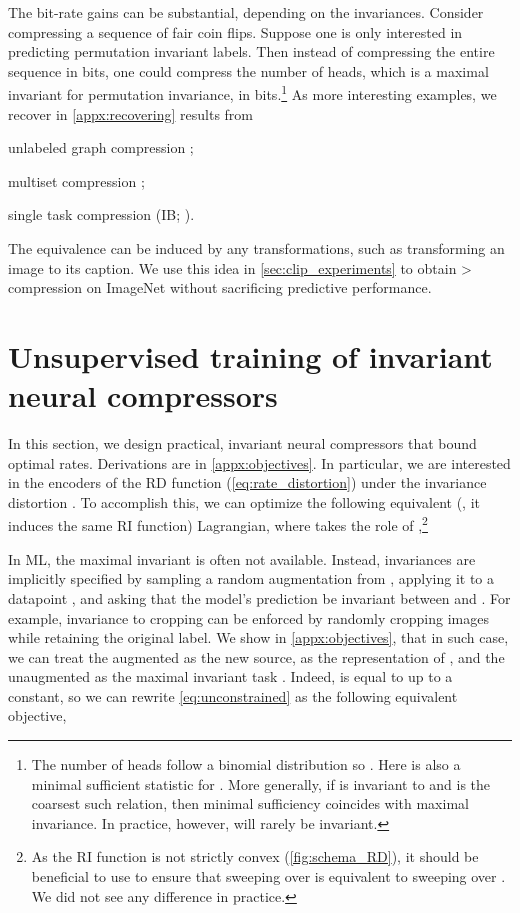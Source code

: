 \documentclass[final]{article}
\begin{document}
The bit-rate gains can be substantial, depending on the invariances.
Consider compressing a sequence of  \iid fair coin flips.
 Suppose one is only interested in predicting permutation invariant labels.
 Then instead of compressing the entire sequence in  bits, one could compress the number of heads, which is a maximal invariant for permutation invariance, in  bits.\footnote{The number of heads  follow a binomial distribution so .
 Here  is also a minimal sufficient statistic for .
 More generally, if  is invariant to  and  is the coarsest such relation, then minimal sufficiency coincides with maximal invariance.
In practice, however,  will rarely be  invariant.
 }
As more interesting examples, we recover in \cref{appx:recovering} results from \begin{inlinelist}
\item unlabeled graph compression \cite{rashevsky_life_1955};
\item multiset compression \cite{varshney_benefiting_2007};
\item single task compression (IB; \cite{tishby_information_2000}).
\end{inlinelist}
The equivalence  can be induced by any transformations, such as transforming an image to its caption. 
We use this idea in \cref{sec:clip_experiments} to obtain > compression on ImageNet without sacrificing predictive performance.  
\section{Unsupervised training of invariant neural compressors}
\label{sec:learning}
In this section, we design practical, invariant neural compressors that bound optimal rates. 
Derivations are in \cref{appx:objectives}.
In particular, we are interested in the  encoders  of the RD function (\cref{eq:rate_distortion}) under the invariance distortion \disttextinv{}.
To accomplish this, we can optimize the following equivalent (\ie, it induces the same RI function) Lagrangian, where  takes the role of ,\footnote{
As the RI function is not strictly convex (\cref{fig:schema_RD}), it should be beneficial to use  to ensure that sweeping over  is equivalent to sweeping over  \cite{kolchinsky_caveats_2019}.
We did not see any difference in practice.
}

In ML, the maximal invariant  is often not available.
Instead, invariances are implicitly specified by sampling a random augmentation from , applying it to a datapoint , and asking that the model's prediction be invariant between  and . 
For example, invariance to cropping can be enforced by randomly cropping images while retaining the original label. 
We show in \cref{appx:objectives}, that in such case, we can treat the augmented  as the new source,  as the representation of , and the unaugmented  as the maximal invariant task .
Indeed,  is equal to  up to a constant, so we can rewrite \cref{eq:unconstrained} as the following equivalent objective,
\end{document}
